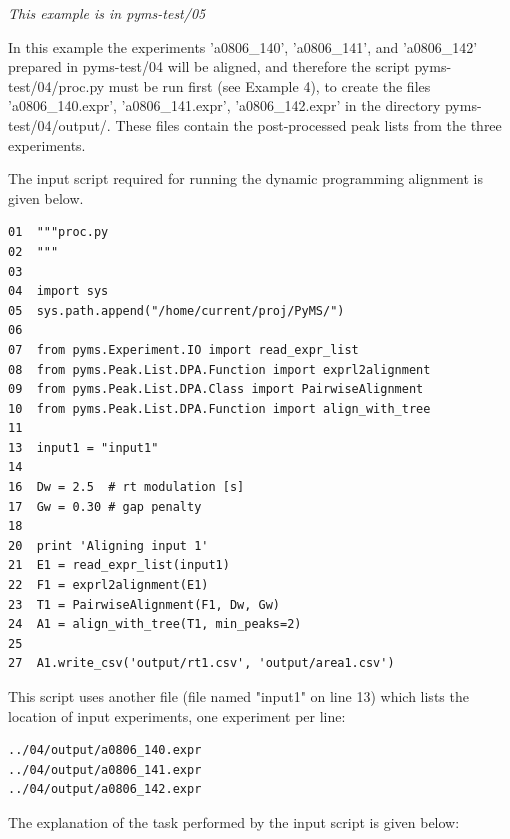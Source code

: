 \noindent
{\em This example is in pyms-test/05}

In this example the experiments 'a0806\_140', 'a0806\_141', and 'a0806\_142'
prepared in pyms-test/04 will be aligned, and therefore the script
pyms-test/04/proc.py must be run first (see Example 4), to create the files
'a0806\_140.expr', 'a0806\_141.expr', 'a0806\_142.expr' in the directory
pyms-test/04/output/. These files contain the post-processed peak lists
from the three experiments. 

The input script required for running the dynamic programming alignment
is given below.

\begin{verbatim}
01  """proc.py
02  """
03 
04  import sys
05  sys.path.append("/home/current/proj/PyMS/")
06  
07  from pyms.Experiment.IO import read_expr_list
08  from pyms.Peak.List.DPA.Function import exprl2alignment
09  from pyms.Peak.List.DPA.Class import PairwiseAlignment
10  from pyms.Peak.List.DPA.Function import align_with_tree
11  
13  input1 = "input1"
14  
16  Dw = 2.5  # rt modulation [s]
17  Gw = 0.30 # gap penalty
18  
20  print 'Aligning input 1'
21  E1 = read_expr_list(input1)
22  F1 = exprl2alignment(E1)
23  T1 = PairwiseAlignment(F1, Dw, Gw)
24  A1 = align_with_tree(T1, min_peaks=2)
25  
27  A1.write_csv('output/rt1.csv', 'output/area1.csv')
\end{verbatim}

\noindent
This script uses another file (file named "input1" on line 13) which lists
the location of input experiments, one experiment per line:

\begin{verbatim}
../04/output/a0806_140.expr
../04/output/a0806_141.expr
../04/output/a0806_142.expr
\end{verbatim}

The explanation of the task performed by the input script is given below:

